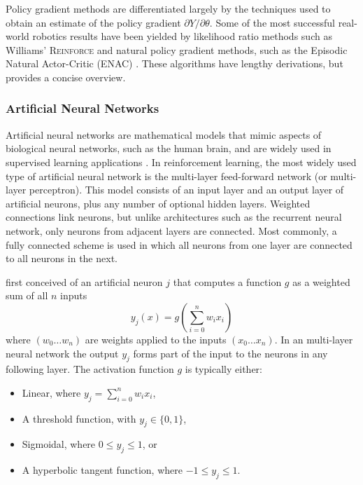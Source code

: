 Policy gradient methods are differentiated largely by the techniques used to
obtain an estimate of the policy gradient $\partial Y / \partial \theta$. Some
of the most successful real-world robotics results
\cite{shaal:robots,benbrahim:1996} have been yielded by likelihood
ratio methods \cite{glynn87,aleksandrov68} such as Williams' \textsc{Reinforce}
\cite{williams:reinforce} and natural policy gradient methods, such as the Episodic Natural Actor-Critic
(ENAC) \cite{peters:enac}. These algorithms have lengthy derivations, but
 provides a concise overview.

\subsubsection{Artificial Neural Networks}
Artificial neural networks are mathematical models that mimic aspects of
biological neural networks, such as the human brain, and are widely used in
supervised learning applications \cite{bishop96ann,fausett94}.
In reinforcement learning, the most widely used type of artificial neural
network is the multi-layer feed-forward network (or multi-layer perceptron).
This model consists of an input layer and an output layer of artificial neurons,
plus any number of optional hidden layers.  Weighted connections link
neurons, but unlike architectures such as the recurrent neural network, only
neurons from adjacent layers are connected.  Most commonly, a fully connected
scheme is used in which all neurons from one layer are connected to all neurons in the
next.


 first conceived of an artificial neuron $j$ that
computes a function $g$ as a weighted sum of all $n$ inputs
\begin{equation}
y_j(x) = g \left(\sum_{i=0}^n w_ix_i\right)
\end{equation}
where $(w_0 \dotsc w_n)$ are weights applied to the inputs $(x_0 \dotsc x_n)$.
In an multi-layer neural network the output $y_j$ forms part of the input
to the neurons in any following layer.  The activation function $g$ is
typically either:
\begin{itemize}
  \item Linear, where $y_j = \sum_{i=0}^n w_ix_i$,
  \item A threshold function, with $y_j \in \lbrace 0,1 \rbrace$,
  \item Sigmoidal, where $0 \leq y_j \leq 1$, or
  \item A hyperbolic tangent function, where $-1 \leq y_j \leq 1$.
\end{itemize}

